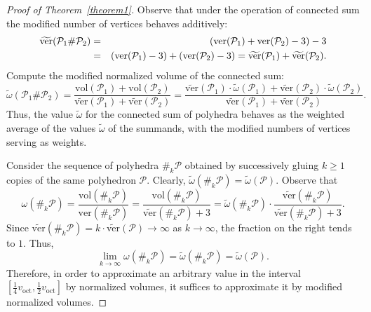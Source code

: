 \documentclass{amsart}
\newcommand{\vol}{\mathrm{vol}}
\newcommand{\tomega}{\widetilde{\omega}}
\newcommand{\tN}{\widetilde{\ver}}
\newcommand{\voct}{v_{\mathrm{oct}}}
\newcommand{\ver}{\mathrm{ver}}
\begin{document}
\begin{proof}[Proof of Theorem~\ref{theorem1}]
			Observe that under the operation of connected sum the modified number of vertices behaves additively:
	\begin{eqnarray*}
		\tN(\mathcal P_1 \# \mathcal P_2) & = & (\ver(\mathcal P_1) + \ver(\mathcal P_2) - 3) - 3 \cr & = & (\ver(\mathcal P_1) - 3) + (\ver(\mathcal P_2) - 3) = \tN(\mathcal P_1) + \tN(\mathcal P_2).
	\end{eqnarray*}
	Compute the modified normalized volume of the connected sum:
	\begin{equation} \label{eqn800}
		\tomega(\mathcal P_1 \# \mathcal P_2) = \frac{\vol(\mathcal P_1) + \vol(\mathcal P_2)}{\tN(\mathcal P_1) + \tN(\mathcal P_2)} = \frac{\tN(\mathcal P_1)\cdot\tomega(\mathcal P_1) + \tN(\mathcal P_2)\cdot\tomega(\mathcal P_2)}{\tN(\mathcal P_1) + \tN(\mathcal P_2)}.
	\end{equation} 
		Thus, the value $\tomega$ for the connected sum of polyhedra behaves as the weighted average of the values $\tomega$ of the summands, with the modified numbers of vertices serving as weights.

	Consider the sequence of polyhedra $\#_k \mathcal P$ obtained by successively gluing $k \geq 1$ copies of the same polyhedron $\mathcal P$.
		Clearly, $\tomega(\#_k \mathcal P) = \tomega(\mathcal P)$.
		Observe that
	$$
	\omega(\#_k \mathcal P) = \frac{\vol(\#_k \mathcal P)}{\ver(\#_k \mathcal P)} = \frac{\vol(\#_k \mathcal P)}{\tN(\#_k \mathcal P) + 3} = \tomega(\#_k \mathcal P) \cdot \frac{\tN(\#_k \mathcal P)}{\tN(\#_k \mathcal P) + 3}.
	$$
	Since $\tN(\#_k \mathcal P) = k \cdot \tN(\mathcal P) \to \infty$ as $k \to \infty$, the fraction on the right tends to $1$.
	Thus,
	$$
	\lim_{k \to \infty} \omega(\#_k \mathcal P) = \tomega(\#_k \mathcal P ) =  \tomega(\mathcal P).
	$$
		Therefore, in order to approximate an arbitrary value in the interval $\left[ \frac{1}{4} \voct, \frac{1}{2} \voct \right]$ by normalized volumes, it suffices to approximate it by modified normalized volumes.


\end{proof}
\end{document}
